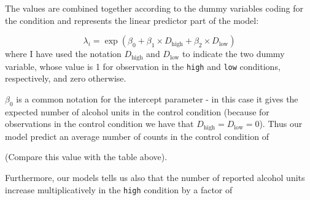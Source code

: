 \documentclass[
]{book}
\newenvironment{Shaded}{\begin{snugshade}}{\end{snugshade}}
\newcommand{\CommentTok}[1]{\textcolor[rgb]{0.56,0.35,0.01}{\textit{#1}}}
\newcommand{\FunctionTok}[1]{\textcolor[rgb]{0.13,0.29,0.53}{\textbf{#1}}}
\newcommand{\NormalTok}[1]{#1}
\newcommand{\SpecialCharTok}[1]{\textcolor[rgb]{0.81,0.36,0.00}{\textbf{#1}}}
\newcommand{\StringTok}[1]{\textcolor[rgb]{0.31,0.60,0.02}{#1}}
\begin{document}
\begin{Shaded}
\end{Shaded}

The values are combined together according to the dummy variables coding for the condition and represents the linear predictor part of the model:

\[
\lambda_i = \exp \left(\beta_0 + \beta_1\times D_\text{high}+ \beta_2\times D_\text{low} \right)
\]
where I have used the notation \(D_\text{high}\) and \(D_\text{low}\) to indicate the two dummy variable, whose value is 1 for observation in the \texttt{high} and \texttt{low} conditions, respectively, and zero otherwise.

\(\beta_0\) is a common notation for the intercept parameter - in this case it gives the expected number of alcohol units in the control condition (because for observations in the control condition we have that \(D_\text{high}= D_\text{low}=0\)). Thus our model predict an average number of counts in the control condition of

\begin{Shaded}
\end{Shaded}

(Compare this value with the table above).

Furthermore, our models tells us also that the number of reported alcohol units increase multiplicatively in the \texttt{high} condition by a factor of

\begin{Shaded}
\end{Shaded}
\end{document}

